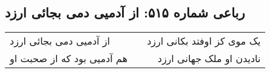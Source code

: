 \begin{center}
\section*{رباعی شماره ۵۱۵: از آدمیی دمی بجائی ارزد}
\label{sec:0515}
\begin{longtable}{l p{0.5cm} r}
از آدمیی دمی بجائی ارزد
&&
یک موی کز اوفتد بکانی ارزد
\\
هم آدمیی بود که از صحبت او
&&
نادیدن او ملک جهانی ارزد
\\
\end{longtable}
\end{center}
